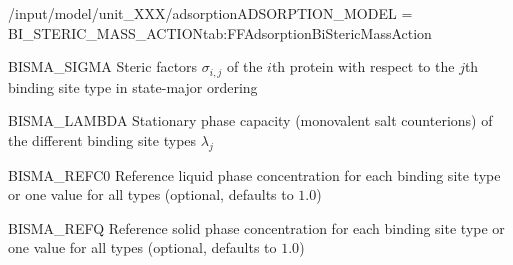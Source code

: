 \begin{condsubgroup}{/input/model/unit\_XXX/adsorption}{ADSORPTION\_MODEL = BI\_STERIC\_MASS\_ACTION}{tab:FFAdsorptionBiStericMassAction}
\begin{dataset}[unit=\si{\per\second}, type = double, range={$\geq 0.0$}, length={$\texttt{NSTATES} \cdot \texttt{NCOMP}$}]{BISMA\_SIGMA}
    Steric factors $\sigma_{i,j}$ of the $i$th protein with respect to the $j$th binding site type in state-major ordering
  \end{dataset} 
  \begin{dataset}[unit=\si{\mol\per\cubic\metre\of{SP}}, type = double, range={$\geq 0.0$}, length={\texttt{NSTATES}}]{BISMA\_LAMBDA} 
    Stationary phase capacity (monovalent salt counterions) of the different binding site types $\lambda_j$
  \end{dataset}
  \begin{dataset}[unit=\si{\mol\per\raiseto{3}\metre\of{MP}}, type = double, range={$> 0$}, length={$\{1,\texttt{NSTATES}\}$}]{BISMA\_REFC0} 
    Reference liquid phase concentration for each binding site type or one value for all types (optional, defaults to $1.0$)
  \end{dataset} 
  \begin{dataset}[unit=\si{\mol\per\raiseto{3}\metre\of{SP}}, type = double, range={$> 0$}, length={$\{1,\texttt{NSTATES}\}$}]{BISMA\_REFQ} 
    Reference solid phase concentration for each binding site type or one value for all types (optional, defaults to $1.0$)
  \end{dataset} 
\end{condsubgroup}

